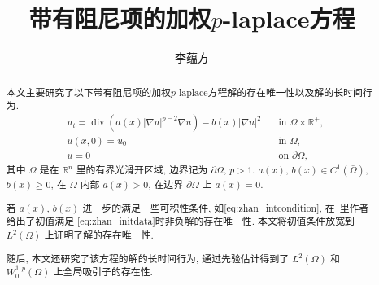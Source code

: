 \documentclass[twoside,longtitle]{LZUthesis}
\theoremstyle{definition}
\numberwithin{equation}{chapter}
\newcommand*\abs[1]{\lvert#1\rvert}
\newcommand\R{\mathbb{R}}
\DeclareMathOperator{\Div}{div}
\begin{document}
\classification{}

\confidential{}

\title{带有阻尼项的加权$p$-laplace方程}




\author{李蕴方}






\submitdate{}


\degreedate{}


\maketitle

\makestatement

\frontmatter{}

\begin{abstract}
本文主要研究了以下带有阻尼项的加权$p$-laplace方程解的存在唯一性以及解的长时间行为. 
\begin{equation*}
	\begin{alignedat}{2}
	& u_t = \Div(a(x)\abs{\nabla u}^{p-2}\nabla u) - b(x)\abs{\nabla u}^2 \quad &\text{in } \Omega \times \R^+,\\
	& u(x,0) = u_0 \quad &\text{in } \Omega,\\
	& u = 0 \quad &\text{on } \partial\Omega,
	\end{alignedat}
\end{equation*}
其中 $\Omega$ 是在 $\R^{n}$ 里的有界光滑开区域, 边界记为 $\partial\Omega$, $p>1$.
$ a(x)$, $b(x) \in C^1(\bar{\Omega}) $, $b(x) \geq 0$, 在 $\Omega$ 内部 $a(x) > 0$, 在边界 $\partial\Omega$ 上 $a(x) = 0$.

若 $a(x)$, $b(x)$ 进一步的满足一些可积性条件, 如\cref{eq:zhan_intcondition}, 在~\citep{Zhan2019Uniquenessa}里作者给出了初值满足
\cref{eq:zhan_initdata}时非负解的存在唯一性. 本文将初值条件放宽到 $L^2(\Omega)$ 上证明了解的存在唯一性.

随后, 本文还研究了该方程的解的长时间行为, 通过先验估计得到了 $L^2(\Omega)$ 和 $W_0^{1,p}(\Omega)$ 上全局吸引子的存在性.
\end{abstract}
\end{document}
